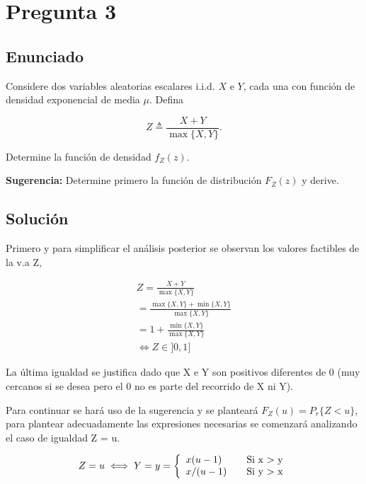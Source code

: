 \section{ Pregunta 3 }

	\subsection{ Enunciado }
		Considere dos variables aleatorias escalares i.i.d. $X$ e $Y$, cada una con función de densidad exponencial de media $\mu$. Defina 

		$$Z\triangleq \frac{X+Y}{\max \lbrace X,Y \rbrace}.$$

		Determine la función de densidad $f_Z(z)$.

		\vspace{5mm}
		\textbf{Sugerencia:} Determine primero la función de distribución $F_Z(z)$ y derive.
	\subsection{ Solución }

		Primero y para simplificar el análisis posterior se observan los valores factibles de la v.a Z,

		\begin{eqnarray}
			Z = \frac{X+Y}{\max \lbrace X,Y \rbrace}\\
			= \frac{\max \lbrace X,Y \rbrace + \min \lbrace X,Y \rbrace}{\max \lbrace X,Y \rbrace}\\
			=  1 + \frac{\min \lbrace X,Y \rbrace}{\max \lbrace X,Y \rbrace}\\
			\iff Z \in ]0,1]
		\end{eqnarray}

		La última igualdad se justifica dado que X e Y son positivos diferentes de 0 (muy cercanos si se desea pero el 0 no es parte del recorrido de X ni Y).\newline

		Para continuar se hará uso de la sugerencia y se planteará $F_Z(u) = P_r\lbrace Z < u \rbrace$, para plantear adecuadamente las expresiones necesarias se comenzará analizando el caso de igualdad Z = u. 

		\begin{eqnarray}
			Z=u \iff Y = y = \left\{
			  \begin{array}{l l}
			    x(u-1) & \quad \text{Si x $>$ y}\\
			    x/(u-1) & \quad \text{Si y $>$ x}
			  \end{array} \right.
		\end{eqnarray}

